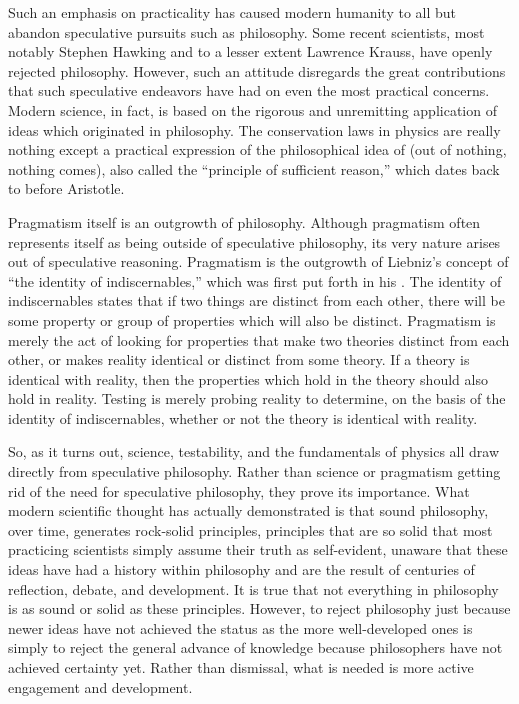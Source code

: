 Such an emphasis on practicality has caused modern humanity to all but abandon speculative pursuits such as philosophy.  
Some recent scientists, most notably Stephen Hawking and to a lesser extent Lawrence Krauss, have openly rejected philosophy.\citep{warman2011, andersen2012}  
However, such an attitude disregards the great contributions that such speculative endeavors have had on even the most practical concerns.  Modern science, in fact, is based on the rigorous and unremitting application of ideas which originated in philosophy.  The conservation laws in physics are really nothing except a practical expression of the philosophical idea of  (out of nothing, nothing comes), also called the ``principle of sufficient reason,'' which dates back to before Aristotle.\citep{psr2011}

Pragmatism itself is an outgrowth of philosophy.  Although pragmatism often represents itself as being outside of speculative philosophy,  its very nature arises out of speculative reasoning.  Pragmatism is the outgrowth of Liebniz's concept of ``the identity of indiscernables,'' which was first put forth in his .\citep{ident2012}  The identity of indiscernables states that if two things are distinct from each other, there will be some property or group of properties which will also be distinct.  Pragmatism is merely the act of looking for properties that make two theories distinct from each other, or makes reality identical or distinct from some theory.  If a theory is identical with reality, then the properties which hold in the theory should also hold in reality.  Testing is merely probing reality to determine, on the basis of the identity of indiscernables, whether or not the theory is identical with reality.

So, as it turns out, science, testability, and the fundamentals of physics all draw directly from speculative philosophy.  Rather than science or pragmatism getting rid of the need for speculative philosophy, they prove its importance.  What modern scientific thought has actually demonstrated is that sound philosophy, over time, generates rock-solid principles, principles that are so solid that most practicing scientists simply assume their truth as self-evident, unaware that these ideas have had a history within philosophy and are the result of centuries of reflection, debate, and development.  It is true that not everything in philosophy is as sound or solid as these principles.  However, to reject philosophy just because newer ideas have not achieved the status as the more well-developed ones is simply to reject the general advance of knowledge because philosophers have not achieved certainty yet.  Rather than dismissal, what is needed is more active engagement and development.

